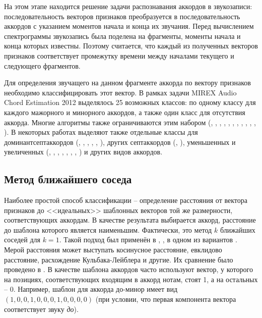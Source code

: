 На этом этапе находится решение задачи распознавания аккордов в звукозаписи:
последовательность векторов признаков преобразуется в последовательность
аккордов с указанием моментов начала и конца их звучания. Перед вычислением
спектрограммы звукозапись была поделена на фрагменты, моменты начала и конца
которых известны. Поэтому считается, что каждый из полученных векторов признаков
соответствует промежутку времени между началами текущего и следующего
фрагментов.

Для определения звучащего на данном фрагменте аккорда по вектору признаков
необходимо классифицировать этот вектор. В рамках задачи MIREX Audio Chord
Estimation 2012 выделялось 25 возможных классов: по одному классу для каждого
мажорного и минорного аккордов, а также один класс для отсутствия аккорда.
Многие алгоритмы также ограничиваются этим набором (\cite{Bello2005},
\cite{Lee2006}, \cite{Khadkevich2009}, \cite{Oudre2009}, \cite{Weller2009},
\cite{Cho2010}, \cite{Rocher2010}, \cite{Cho2011}, \cite{Jiang2011},
\cite{Ni2011}, \cite{Chen2012}, \cite{Humphrey2012}). В некоторых работах
выделяют также отдельные классы для доминантсептаккордов (\cite{Sheh2003},
\cite{Mauch2008}, \cite{Zhang2008}, \cite{Mauch2009}, \cite{Mauch2010},
\cite{DeHaas2012}), других септаккордов (\cite{Sheh2003}, \cite{Mauch2010}),
уменьшенных и увеличенных (\cite{Sheh2003}, \cite{Burgoyne2007},
\cite{Lee2008}, \cite{Mauch2008}, \cite{Sumi2008}, \cite{Mauch2009},
\cite{Mauch2010}, \cite{Ni2012}) и других видов аккордов.

\subsection{Метод ближайшего соседа}

Наиболее простой способ классификации -- определение расстояния от вектора
признаков до <<идеальных>> шаблонных векторов той же размерности,
соответствующих аккордам. В качестве результата выбирается аккорд, расстояние до
шаблона которого является наименьшим. Фактически, это метод $k$ ближайших
соседей для $k=1$. Такой подход был применён в \cite{Lee2006}, \cite{Oudre2009},
в одном из вариантов \cite{Jiang2011}. Мерой расстояния может выступать
косинусное расстояние, евклидово расстояние, расхождение Кульбака-Лейблера и
другие. Их сравнение было проведено в \cite{Oudre2009}. В качестве шаблона
аккордов часто используют вектор, у которого на позициях, соответствующих
входящим в аккорд нотам, стоят 1, а на остальных -- 0. Например, шаблон для
аккорда до-минор имеет вид $(1,0,0,1,0,0,0,1,0,0,0,0)$ (при условии, что первая
компонента вектора соответствует звуку \emph{до}).

